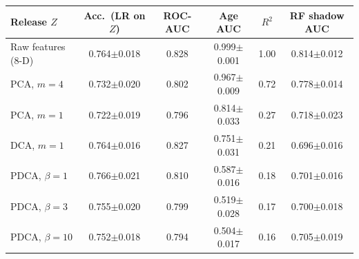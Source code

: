 \begin{tabular}{@{}lccccc@{}}
\toprule
Release $Z$ & Acc.\ (LR on $Z$) & ROC-AUC & Age AUC & $R^2$ & RF shadow AUC \\
\midrule
Raw features (8-D) & 0.764$\pm$0.018 & 0.828 & 0.999$\pm$0.001 & 1.00 & 0.814$\pm$0.012 \\
PCA, $m{=}4$ & 0.732$\pm$0.020 & 0.802 & 0.967$\pm$0.009 & 0.72 & 0.778$\pm$0.014 \\
PCA, $m{=}1$ & 0.722$\pm$0.019 & 0.796 & 0.814$\pm$0.033 & 0.27 & 0.718$\pm$0.023 \\
DCA, $m{=}1$ & 0.764$\pm$0.016 & 0.827 & 0.751$\pm$0.031 & 0.21 & 0.696$\pm$0.016 \\
PDCA, $\beta{=}1$ & 0.766$\pm$0.021 & 0.810 & 0.587$\pm$0.016 & 0.18 & 0.701$\pm$0.016 \\
PDCA, $\beta{=}3$ & 0.755$\pm$0.020 & 0.799 & 0.519$\pm$0.028 & 0.17 & 0.700$\pm$0.018 \\
PDCA, $\beta{=}10$ & 0.752$\pm$0.018 & 0.794 & 0.504$\pm$0.017 & 0.16 & 0.705$\pm$0.019 \\
\bottomrule
\end{tabular}
